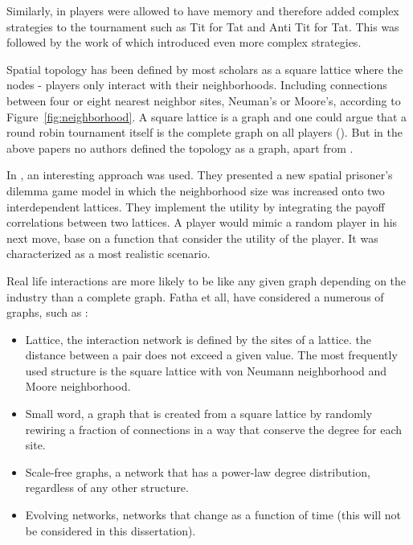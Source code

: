 Similarly, in \parencite{Lindgren1994} players were allowed to have
memory and therefore added complex strategies to the tournament such as Tit for
Tat and  Anti Tit for Tat. This was followed  by the work of
\parencite{Brauchli1999} which introduced even more
complex strategies.

Spatial topology has been defined by most scholars as a square lattice where
the nodes - players only interact with their neighborhoods. Including connections
between four or eight nearest neighbor sites, Neuman's or Moore's, according to
Figure~\ref{fig:neighborhood}. A square lattice is a graph and one could argue
that a round robin tournament itself is the complete graph on all players
(\cite{some general book about graph theory}). But in the above papers
no authors defined the topology as a graph, apart from \parencite{Meng2015}.

In \parencite{Meng2015}, an interesting approach was used. They presented a new
spatial prisoner's dilemma game model in which the neighborhood size was
increased onto two interdependent lattices. They implement the utility by
integrating the payoff correlations between two lattices. A player would mimic a
random player in his next move, base on a function that consider the utility of
the player. It was characterized as a most realistic scenario.

Real life interactions are more likely to be like any given graph depending on
the industry than a complete graph. Fatha et all, have considered a numerous of graphs,
such as :

\begin{itemize}
  \item Lattice, the interaction network is defined by the sites of a lattice.
   the distance between a pair does not exceed a given value.
   The most frequently used structure is the square lattice with von Neumann
   neighborhood and Moore neighborhood.
  \item Small word, a graph that is created from a square lattice by randomly
   rewiring a fraction of connections in a way that conserve the degree for
   each site.
  \item Scale-free graphs, a network that has a power-law degree distribution, regardless of
   any other structure.
  \item Evolving networks, networks that change as a function of time (this will
      not be considered in this dissertation).
\end{itemize}

